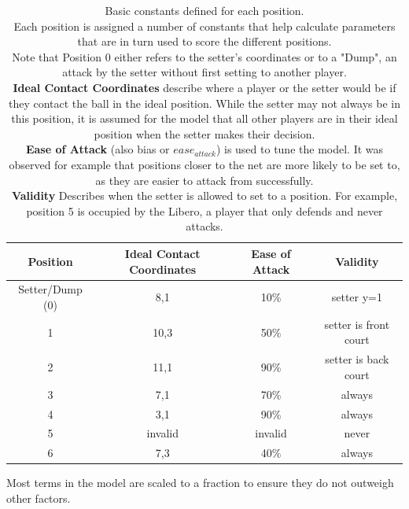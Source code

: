 \documentclass[main.tex]{subfiles}
\begin{document}
      \begin{table}[h!]
        \label{tab:positions}
        \centering
        \caption{Basic constants defined for each position. \\
          Each position is assigned a number of constants that help calculate parameters that are in turn used to score the different positions. \\
          Note that Position 0 either refers to the setter's coordinates or to a "Dump", an attack by the setter without first setting to another player. \\
          \textbf{Ideal Contact Coordinates} describe where a player or the setter would be if they contact the ball in the ideal position. While the setter may not always be in this position, it is assumed for the model that all other players are in their ideal position when the setter makes their decision. \\
          \textbf{Ease of Attack} (also bias or \(ease_{attack}\)) is used to tune the model. It was observed for example that positions closer to the net are more likely to be set to, as they are easier to attack from successfully. \\
          \textbf{Validity} Describes when the setter is allowed to set to a position. For example, position 5 is occupied by the Libero, a player that only defends and never attacks. 
          }
        \small
        \begin{tabular}{ c | c c c }
          \hline
          Position  & Ideal Contact Coordinates & Ease of Attack & Validity \\ \hline \hline
          Setter/Dump (0) &  8,1 & 10\% & setter y=1 \\
          1 & 10,3 & 50\% & setter is front court \\
          2 & 11,1 & 90\% & setter is back court \\
          3 & 7,1 & 70\% &  always \\
          4 & 3,1 & 90\% & always \\
          5 & invalid & invalid & never\\
          6 & 7,3 & 40\% & always \\
          \hline
        \end{tabular}
        \normalsize
      \end{table}
      Most terms in the model are scaled to a fraction to ensure they do not outweigh other factors.
      \\\\
\end{document}
